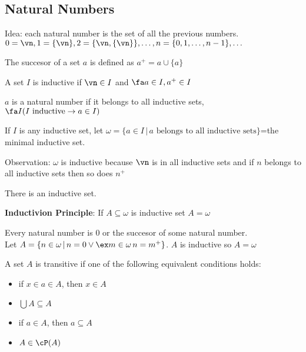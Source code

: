 
\subsection{Natural Numbers}

Idea: each natural number is the set of all the previous numbers. \\
$0 = \vn, 1 = \{\vn\}, 2 = \{\vn, \{\vn \} \},\ldots, n = \{0, 1, \ldots, n-1\}, \ldots$ 

\begin{definition}
    The succesor of a set $a$ is defined as $a^+ = a \cup \{a\}$ 
\end{definition}

\begin{definition}
    A set $I$ is inductive if $\vn \in I$ and $\fa a \in I, a^+ \in I$ 
\end{definition}

\begin{definition}
    $a$ is a natural number if it belongs to all inductive sets, $\fa I (I \text{ inductive} \to a \in I)$ 
\end{definition}

\noindent
If $I$ is any inductive set, let $\omega = \{a \in I \, | \, a \text{ belongs to all inductive sets}\}$=the minimal inductive set. 

\noindent
Observation: $\omega$ is inductive because $\vn$ is in all inductive sets and if $n$ belongs to all inductive sets then so does $n^+$

\begin{axiom}
    There is an inductive set. 
\end{axiom}

\noindent
\textbf{Inductivion Principle}: If $A \subseteq \omega$ is inductive set $A = \omega$ 

\begin{example}
    Every natural number is 0 or the succesor of some natural number. \\
    Let $A = \{ n \in \omega \, | \, n=0 \vee \ex m \in \omega \, n=m^+\}$. $A$ is inductive so $A = \omega$ 
\end{example}

\begin{definition}
    A set $A$ is transitive if one of the following equivalent conditions holds: 
    \begin{itemize}
        \item if $x \in a \in A$, then $x \in A$
        \item $\bigcup A \subseteq A$ 
        \item if $a \in A$, then $a \subseteq A$ 
        \item $A \in \cP(A)$ 
    \end{itemize}
\end{definition}

